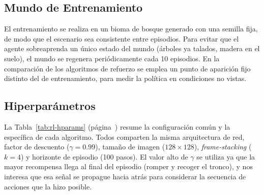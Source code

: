 \subsection{Mundo de Entrenamiento}
El entrenamiento se realiza en un \gls{bioma} de bosque generado con una \gls{semilla}
fija, de modo que el escenario sea consistente entre episodios. Para evitar que el agente
sobreaprenda un único estado del mundo (árboles ya talados, madera en el suelo),
el mundo se regenera periódicamente cada \num{10} episodios. En la comparación de los algoritmos
de refuerzo se emplea un punto de aparición fijo distinto del de
entrenamiento, para medir la \gls{política} en condiciones no vistas.

\subsection{Hiperparámetros}
La Tabla~\ref{tab:rl-hparams} (página~\pageref{tab:rl-hparams}) resume la configuración común y la específica de cada
algoritmo. Todos comparten la misma arquitectura de red, factor de descuento
($\gamma=\num{0.99}$), tamaño de imagen ($\num{128}\times\num{128}$), \textit{\gls{frame-stacking}} ($k=\num{4}$) y
horizonte de episodio (\num{100} pasos). El valor alto de $\gamma$ se utiliza ya que la mayor
recompensa llega al final del episodio (romper y recoger el tronco), y nos interesa que esa señal
se propague hacia atrás para considerar la secuencia de acciones que la hizo posible.

